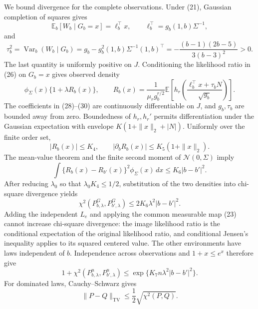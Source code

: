 We bound divergence for the complete observations.  Under (21), Gaussian completion of squares gives
\[
 \mathbb E_b[W_b\mid G_b=x]=\ell_b^\top x,
 \qquad \ell_b^\top=g_b(1,b)\Sigma^{-1},                                 \tag{28}
\]
and
\[
 \tau_b^2=\operatorname{Var}_b(W_b\mid G_b)
 =g_b-g_b^2(1,b)\Sigma^{-1}(1,b)^\top
 =-\frac{(b-1)(2b-5)}{3(b-3)^2}>0.                                       \tag{29}
\]
The last quantity is uniformly positive on \(J\).  Conditioning the likelihood ratio in (26) on \(G_b=x\) gives observed density
\[
 \phi_\Sigma(x)\{1+\lambda R_b(x)\},
 \qquad
 R_b(x)=\frac1{\mu_rg_b^{r/2}}
 \mathbb E\left[h_r\!\left(
 \frac{\ell_b^\top x+\tau_bN}{\sqrt{g_b}}\right)\right].               \tag{30}
\]
The coefficients in (28)--(30) are continuously differentiable on \(J\), and \(g_b,\tau_b\) are bounded away from zero.  Boundedness of \(h_r,h_r'\) permits differentiation under the Gaussian expectation with envelope \(K(1+\|x\|_2+|N|)\).  Uniformly over the finite order set,
\[
 |R_b(x)|\leq K_4,
 \qquad |\partial_bR_b(x)|\leq K_5(1+\|x\|_2).                           \tag{31}
\]
The mean-value theorem and the finite second moment of \(\mathcal N(0,\Sigma)\) imply
\[
 \int\{R_b(x)-R_{b'}(x)\}^2\phi_\Sigma(x)\,dx
 \leq K_6|b-b'|^2.                                                        \tag{32}
\]
After reducing \(\lambda_0\) so that \(\lambda_0K_4\leq1/2\), substitution of the two densities into chi-square divergence yields
\[
 \chi^2(P^G_{b,\lambda},P^G_{b',\lambda})
 \leq2K_6\lambda^2|b-b'|^2.                                              \tag{33}
\]
Adding the independent \(L_e\) and applying the common measurable map (23) cannot increase chi-square divergence: the image likelihood ratio is the conditional expectation of the original likelihood ratio, and conditional Jensen's inequality applies to its squared centered value.  The other environments have laws independent of \(b\).  Independence across observations and \(1+x\leq e^x\) therefore give
\[
 1+\chi^2(P_{b,\lambda}^{n},P_{b',\lambda}^{n})
 \leq\exp\{K_7n\lambda^2|b-b'|^2\}.                                    \tag{34}
\]
For dominated laws, Cauchy--Schwarz gives
\[
 \|P-Q\|_{\mathrm{TV}}\leq\frac12\sqrt{\chi^2(P,Q)}.                  \tag{35}
\]

